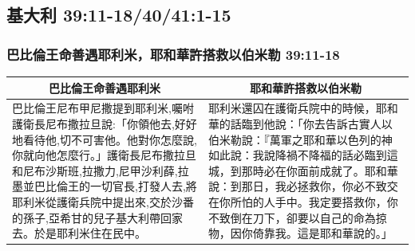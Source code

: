\subsection{基大利 39:11-18/40/41:1-15}
\subsubsection{巴比倫王命善遇耶利米，耶和華許搭救以伯米勒 39:11-18}
\begin{table}[H]
\centering
\begin{tabular}{p{8.75cm}|p{9.0cm}}\hline\hline
\multicolumn{1}{c|}{巴比倫王命善遇耶利米}&\multicolumn{1}{c}{耶和華許搭救以伯米勒}\\\hline
巴比倫王尼布甲尼撒提到耶利米,囑咐護衛長尼布撒拉旦說:「你領他去,好好地看待他,切不可害他。他對你怎麼說,你就向他怎麼行。」護衛長尼布撒拉旦和尼布沙斯班,拉撒力,尼甲沙利薛,拉墨並巴比倫王的一切官長,打發人去,將耶利米從護衛兵院中提出來,交於沙番的孫子,亞希甘的兒子基大利帶回家去。於是耶利米住在民中。
&耶利米還囚在護衛兵院中的時候，耶和華的話臨到他說：「你去告訴古實人以伯米勒說：『萬軍之耶和華以色列的神如此說：我說降禍不降福的話必臨到這城，到那時必在你面前成就了。耶和華說：到那日，我必拯救你，你必不致交在你所怕的人手中。我定要搭救你，你不致倒在刀下，卻要以自己的命為掠物，因你倚靠我。這是耶和華說的。」\\\hline
\end{tabular}
\end{table}




